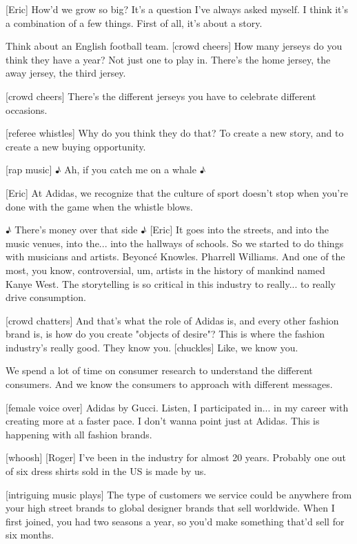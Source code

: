 \documentclass[a4paper]{article}
\begin{document}
	
	
	[Eric] How'd we grow so big? It's a question I've always asked myself. I think it's a combination of a few things.
	First of all, it's about a story. 
	
	
	Think about an English football team.
	[crowd cheers]
	How many jerseys do you think they have a year?
	Not just one to play in. There's the home jersey, the away jersey, the third jersey.
	
	
	
	[crowd cheers]
	There's the different jerseys you have to celebrate different occasions.
	
	
	
	[referee whistles]
	Why do you think they do that?
	To create a new story, and to create a new buying opportunity.
	
	
	
	[rap music]
	♪ Ah, if you catch me on a whale ♪
	
	
	[Eric] At Adidas, we recognize that the culture of sport doesn't stop when you're done with the game when the whistle blows.
	
	
	♪ There's money over that side ♪
	[Eric] It goes into the streets, and into the music venues, into the... into the hallways of schools.
	So we started to do things with musicians and artists.
	Beyoncé Knowles.
	Pharrell Williams.
	And one of the most, you know, controversial, um, artists in the history of mankind named Kanye West.
	The storytelling is so critical in this industry to really... to really drive consumption.
	
	
	
	[crowd chatters]
	And that's what the role of Adidas is, and every other fashion brand is, is how do you create "objects of desire"?
	This is where the fashion industry's really good. They know you.
	[chuckles] Like, we know you.
	
	
	
	We spend a lot of time on consumer research to understand the different consumers.
	And we know the consumers to approach with different messages.
	
	
	[female voice over] Adidas by Gucci.
	Listen, I participated in... in my career with creating more at a faster pace.
	I don't wanna point just at Adidas. This is happening with all fashion brands.
	
	
	[whoosh]
	[Roger] I've been in the industry for almost 20 years.
	Probably one out of six dress shirts sold in the US is made by us.
	
	
	[intriguing music plays]
	The type of customers we service could be anywhere from your high street brands to global designer brands that sell worldwide.
	When I first joined, you had two seasons a year, so you'd make something that'd sell for six months.
	
\end{document}
